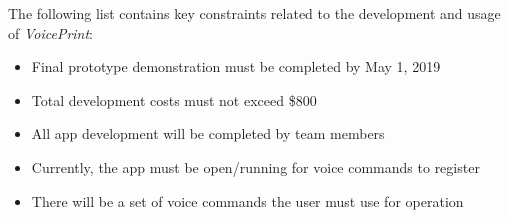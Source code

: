 The following list contains key constraints related to the development and usage of \textit{VoicePrint}:

\begin{itemize}
  \item Final prototype demonstration must be completed by May 1, 2019
  \item Total development costs must not exceed \$800
  \item All app development will be completed by team members
  \item Currently, the app must be open/running for voice commands to register
  \item There will be a set of voice commands the user must use for operation
\end{itemize}